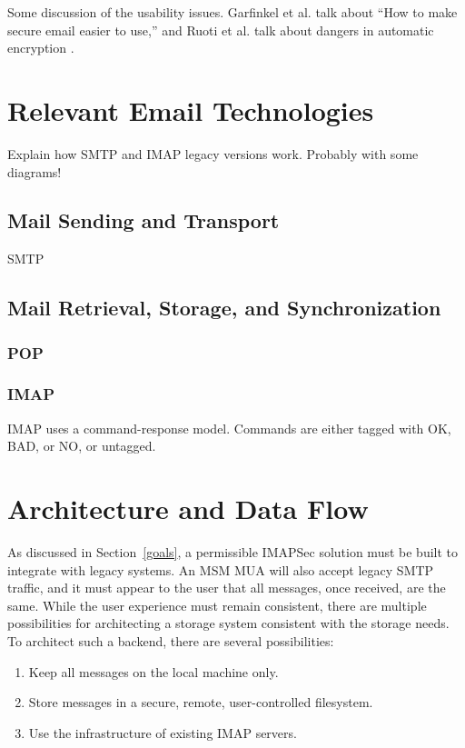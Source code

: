 \documentclass[pageno]{jpaper}
\newcommand{\project}{IMAPSec }
\begin{document}
Some discussion of the usability issues. Garfinkel et al. \cite{garfinkel} talk about ``How to make secure email easier to use,'' and Ruoti et al. talk about dangers in automatic encryption \cite{ruoti}.

\section{Relevant Email Technologies}
Explain how SMTP and IMAP legacy versions work. Probably with some diagrams!
\subsection{Mail Sending and Transport}
SMTP

\subsection{Mail Retrieval, Storage, and Synchronization}
\subsubsection{POP}
\subsubsection{IMAP}
IMAP uses a command-response model. Commands are either tagged with OK, BAD, or NO, or untagged.

\label{legacyimap}


\section{Architecture and Data Flow}
\label{architecture}

As discussed in Section~\ref{goals}, a permissible \project solution must be built to integrate with legacy systems. An MSM MUA will also accept legacy SMTP traffic, and it must appear to the user that all messages, once received, are the same. While the user experience must remain consistent, there are multiple possibilities for architecting a storage system consistent with the storage needs. To architect such a backend, there are several possibilities:

\begin{enumerate}
	\item Keep all messages on the local machine only.
    \item Store messages in a secure, remote, user-controlled filesystem.
    \item Use the infrastructure of existing IMAP servers.
\end{enumerate}
\end{document}

